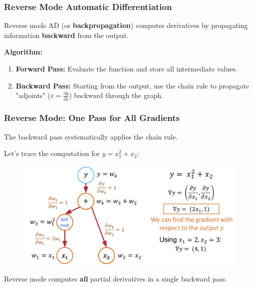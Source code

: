 \documentclass[notes]{beamer}
\begin{document}
\begin{frame}
	\frametitle{Reverse Mode Automatic Differentiation}
	
	Reverse mode AD (or \textbf{backpropagation}) computes derivatives by propagating information \textbf{backward} from the output.
	
	\textbf{Algorithm:}
	\begin{enumerate}
		\item \textbf{Forward Pass:} Evaluate the function and store all intermediate values.
		\item \textbf{Backward Pass:} Starting from the output, use the chain rule to propagate "adjoints" ($\bar{v} = \frac{\partial y}{\partial v}$) backward through the graph.
	\end{enumerate}
	
\end{frame}

\begin{frame}
	\frametitle{Reverse Mode: One Pass for All Gradients}
	The backward pass systematically applies the chain rule.
	
	Let's trace the computation for $y = x_1^2 + x_2$:
	\begin{figure}[ht]
		\centering
		\includegraphics[width=\textwidth]{figs/ad7.png}
	\end{figure}
	Reverse mode computes \textbf{all} partial derivatives in a single backward pass.
	
\end{frame}

\end{document}

